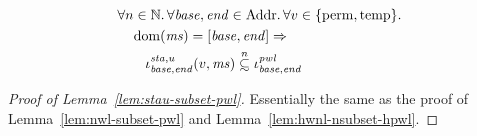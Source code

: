 \documentclass[a4paper]{article}
\newcommand\subsetsim{\mathrel{\ooalign{\raise.2ex\hbox{$\subset$}\cr
      \hidewidth\lower.8ex\hbox{\scalebox{0.9}{$\sim$}}\hidewidth\cr}}}
\newcommand{\nsubsim}[1][n]{\stackrel{\tiny{#1}}{\subsetsim}}
\DeclareMathOperator{\dom}{dom}
\newcommand\dominique[1]{{\color{purple} \sf \footnotesize {DD: #1}}\\}
\renewcommand\dominique[1]{}
\newcommand{\var}[1]{\mathit{#1}}
\newcommand{\hs}{\var{ms}}
\newcommand{\ms}{\hs}
\newcommand{\start}{\var{base}}
\newcommand{\addrend}{\var{end}}
\newcommand{\pwl}{\var{pwl}}
\newcommand{\sta}{\var{sta}}
\newcommand{\asmType}{\plaindom{AsmType}}
\newcommand{\plaindom}[1]{\mathrm{#1}}
\newcommand{\Addrs}{\plaindom{Addr}}
\newcommand{\nats}{\mathbb{N}}
\newcommand{\intr}[2]{\mathcal{#1}}
\newcommand{\valueintr}[1]{\intr{V}{#1}}
\newcommand{\stdvr}{\valueintr{\asmType}}
\newcommand{\npair}[2][n]{\left(#1,#2 \right)}
\newcommand{\plainview}[1]{\mathrm{#1}}
\newcommand{\perma}{\plainview{perm}}
\newcommand{\temp}{\plainview{temp}}
\begin{document}
\begin{lemma}
  \label{lem:stau-subset-pwl}
  \begin{align*}
    & \forall n \in \nats\ldotp \forall \start, \addrend \in \Addrs \ldotp \forall v \in \{\perma, \temp\} \ldotp \\
    & \quad \dom(\ms) = [\start,\addrend] \Rightarrow \\
    & \qquad \iota^{\sta,u}_{\start,\addrend}(v,\ms) \nsubsim \iota^\pwl_{\start,\addrend}
  \end{align*}
  \dominique{err.. shouldn't you require that $\npair{\ms(a)}\in\stdvr(W)$ for
    all $W$.  Hm: this probably doesn't hold like that?}
\end{lemma}
\begin{proof}[Proof of Lemma~\ref{lem:stau-subset-pwl}]
  Essentially the same as the proof of Lemma~\ref{lem:nwl-subset-pwl} and Lemma~\ref{lem:hwnl-nsubset-hpwl}.
\end{proof}
\end{document}
